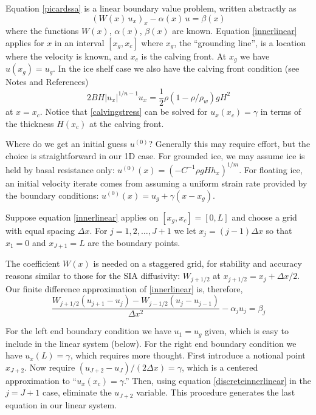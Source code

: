\documentclass[letterpaper,final,12pt,reqno]{amsart}
\begin{document}
Equation \eqref{picardssa} is a linear boundary value problem, written abstractly as
\begin{equation}
  \left(W(x)\, u_x\right)_x - \alpha(x)\, u = \beta(x)  \label{innerlinear}
\end{equation}
where the functions $W(x)$, $\alpha(x)$, $\beta(x)$ are known.  Equation \eqref{innerlinear} applies for $x$ in an interval $[x_g,x_c]$ where $x_g$, the ``grounding line'', is a location where the velocity is known, and $x_c$ is the calving front.  At $x_g$ we have $u(x_g)=u_g$.  In the ice shelf case we also have the calving front condition (see Notes and References)
\begin{equation}
  2 B H |u_x|^{1/n - 1} u_x = \frac{1}{2}\rho (1-\rho/\rho_w) g H^2  \label{calvingstress}
\end{equation}
at $x=x_c$.  Notice that \eqref{calvingstress} can be solved for $u_x(x_c)=\gamma$ in terms of the thickness $H(x_c)$ at the calving front.

Where do we get an initial guess $u^{(0)}$?  Generally this may require effort, but the choice is straightforward in our 1D case.  For grounded ice, we may assume ice is held by basal resistance only: $u^{(0)}(x) = \left(-C^{-1} \rho g H h_x\right)^{1/m}$.  For floating ice, an initial velocity iterate comes from assuming a uniform strain rate provided by the boundary conditions: $u^{(0)}(x) = u_g + \gamma (x-x_g)$.

Suppose equation \eqref{innerlinear} applies on $[x_g,x_c]=[0,L]$ and choose a grid with equal spacing $\Delta x$.  For $j=1,2,\dots,J+1$ we let $x_j=(j-1)\Delta x$ so that $x_1 = 0$ and $x_{J+1} = L$ are the boundary points.

The coefficient $W(x)$ is needed on a staggered grid, for stability and accuracy reasons similar to those for the SIA diffusivity: $W_{j+1/2}$ at $x_{j+1/2} = x_j + \Delta x/2$.  Our finite difference approximation of \eqref{innerlinear} is, therefore,
\begin{equation}
  \frac{W_{j+1/2} (u_{j+1} - u_j) - W_{j-1/2} (u_{j} - u_{j-1})}{\Delta x^2} - \alpha_j u_j = \beta_j  \label{discreteinnerlinear}
\end{equation}

For the left end boundary condition we have $u_1 = u_g$ given, which is easy to include in the linear system (below).  For the right end boundary condition we have $u_x(L)=\gamma$, which requires more thought.  First introduce a notional point $x_{J+2}$.  Now require $(u_{J+2} - u_J)/(2 \Delta x) = \gamma$, which is a centered approximation to ``$u_x(x_c)=\gamma$.''  Then, using equation \eqref{discreteinnerlinear} in the $j=J+1$ case, eliminate the $u_{J+2}$ variable.  This procedure generates the last equation in our linear system.
\end{document}
